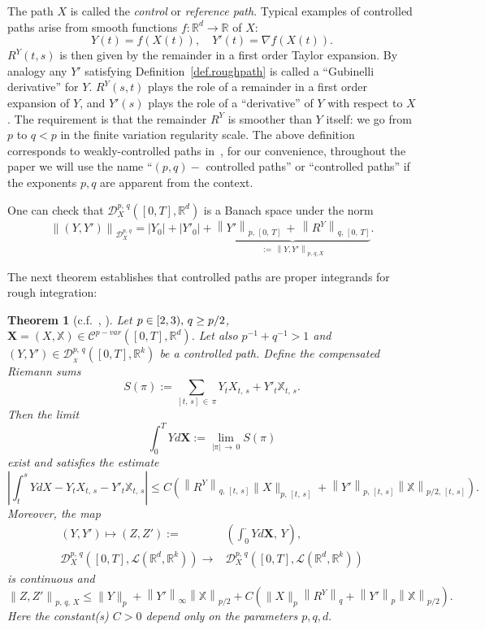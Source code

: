 \documentclass[10pt]{amsart}
\newtheorem{theo}{Theorem}[section]
\theoremstyle{definition}\newtheorem{defi}[theo]{Definition}\newtheorem{rema}[theo]{Remark}\newtheorem{exam}[theo]{Example}\newtheorem{exem}[theo]{Example}\newtheorem{nota}[theo]{Notation}
\newcommand{\bfX}{\mathbf{X}}
\newcommand{\scrD}{\mathscr{D}}
\newcommand{\bbX}{\mathbb{X}}
\newcommand{\calD}{\mathcal{D}}
\newcommand{\calL}{\mathcal{L}}
\newcommand{\calC}{\mathcal{C}}
\newcommand{\Rr}{{\mathbb{R}}}
\begin{document}
The path $X$ is called the \emph{control} or \emph{reference path}. Typical examples of controlled paths arise from smooth functions $f: \Rr^d\to \Rr$ of $X$:
\[
Y(t)=f(X(t)),\quad Y'(t)=\nabla f(X(t)).
\]
$R^Y(t,s)$ is then given by the remainder in a first order Taylor expansion. By analogy any $Y'$ satisfying Definition~\ref{def.roughpath} is called a ``Gubinelli derivative'' for $Y$. $R^{Y}(s,t)$ plays the role of a remainder in a first order expansion of $Y$, and $Y'(s)$ plays the role of a ``derivative'' of $Y$ with respect to $X$. The requirement is that the remainder $R^{Y}$ is smoother than $Y$ itself: we go from $p$ to $q<p$ in the finite variation regularity scale. The above definition corresponds to weakly-controlled paths in~\cite{gubinelli2004}, for our convenience, throughout the paper we will use the name ``$(p, q)-$ controlled paths'' or ``controlled paths'' if the exponents $p, q$ are apparent from the context.

One can check that $\scrD^{p,\,q}_{X}([0,T],\Rr^d)$ is a Banach space under the norm
\[
\left\|\left(Y,Y'\right)\right\|_{\scrD^{p,\,q}_{X}}= \left|Y_0\right|+\left|Y'_0\right|+ \underbrace{\left\|Y'\right\|_{p,\,[0,\,T]}\,+\,\left\|R^Y\right\|_{q,\,[0,\,T]}}_{:=\,\left\|Y,Y'\right\|_{p,\,q,X}}.
\]



The next theorem establishes that controlled paths are proper integrands for rough integration:
\begin{theo}[{c.f.~\cite[Theorem~4.10]{frizhairer}, \cite[Theorem~1]{gubinelli2004}}]\label{chp02theorem:itegralcontrol}
Let $p\linebreak\in [2, 3),\, q\geq p/2$, $\bfX=(X,\bbX)\in\calC^{p-var}([0,T], \Rr^d)$. Let also $p^{-1}+q^{-1}>1$ and $(Y,Y')\in\calD^{p,\,q}_{_X}([0,T], \Rr^k)$ be a controlled path. Define the compensated Riemann sums
\[
S (\pi):=\sum_{[t,\,s]\,\in\,\pi} Y_{t}X_{t,\,s}+ Y'_{t}\bbX_{t,\,s}.
\]
Then the limit
\[
\int_0^T Y d\bfX:= \lim_{|\pi|\,\to\,0} S (\pi)
\]
exist and satisfies the estimate
\[
\left|\int_t^s Y dX-Y_{t}X_{t,\,s}- Y'_{t}{\bbX}_{t,\,s}\right|
\leq C\left(\left\|{R}^Y\right\|_{q,\,[t,\,s]}\|X\|_{p,\,[t,\,s]}+\left\|Y'\right\|_{p,\,[t,\,s]}\left\|\bbX\right\|_{p/2,\,[t,\,s]}\right).
\]
Moreover, the map
\begin{align*}
\left(Y,Y'\right)\mapsto \left(Z,Z'\right):=& \left(\int_0^{\cdot}Yd\bfX,\, Y\right),
\\
\scrD^{p,\,q}_{X}\left([0,T],\calL\left(\Rr^d,\Rr^k\right)\right)\rightarrow& \scrD^{p,\,q}_{X}\left([0,T],\calL\left(\Rr^d,\Rr^k\right)\right)
\end{align*}
is continuous and
\[
\left\|Z,Z'\right\|_{p,\,q,\,X}\leq \|Y\|_{p}+\left\|Y'\right\|_{\infty}\left\|\bbX\right\|_{p/2} +C\left(\|X\|_{p}\left\|R^{Y}\right\|_{q}+\left\|Y'\right\|_{p}\left\|\bbX\right\|_{p/2}\right).
\]
Here the constant(s) $C>0$ depend only on the parameters $p, q, d.$
\end{theo}
\end{document}
